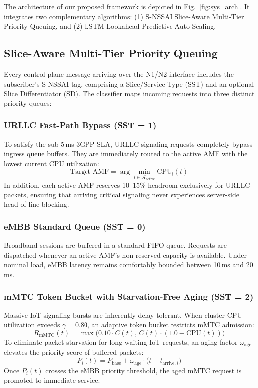 \documentclass[conference]{IEEEtran}
\begin{document}
The architecture of our proposed framework is depicted in Fig.~\ref{fig:sys_arch}. It integrates two complementary algorithms: (1) S-NSSAI Slice-Aware Multi-Tier Priority Queuing, and (2) LSTM Lookahead Predictive Auto-Scaling.

\subsection{Slice-Aware Multi-Tier Priority Queuing}
Every control-plane message arriving over the N1/N2 interface includes the subscriber's S-NSSAI tag, comprising a Slice/Service Type (SST) and an optional Slice Differentiator (SD). The classifier maps incoming requests into three distinct priority queues:

\subsubsection{URLLC Fast-Path Bypass (SST = 1)}
To satisfy the sub-5\,ms 3GPP SLA, URLLC signaling requests completely bypass ingress queue buffers. They are immediately routed to the active AMF with the lowest current CPU utilization:
\begin{equation}
\text{Target AMF} = \arg\min_{i \in \mathcal{A}_{\text{active}}} \text{CPU}_i(t)
\end{equation}
In addition, each active AMF reserves 10--15\% headroom exclusively for URLLC packets, ensuring that arriving critical signaling never experiences server-side head-of-line blocking.

\subsubsection{eMBB Standard Queue (SST = 0)}
Broadband sessions are buffered in a standard FIFO queue. Requests are dispatched whenever an active AMF's non-reserved capacity is available. Under nominal load, eMBB latency remains comfortably bounded between 10\,ms and 20\,ms.

\subsubsection{mMTC Token Bucket with Starvation-Free Aging (SST = 2)}
Massive IoT signaling bursts are inherently delay-tolerant. When cluster CPU utilization exceeds $\gamma = 0.80$, an adaptive token bucket restricts mMTC admission:
\begin{equation}
R_{\text{mMTC}}(t) = \max\Big(0.10 \cdot C(t), \, C(t) \cdot (1.0 - \text{CPU}(t))\Big)
\end{equation}
To eliminate packet starvation for long-waiting IoT requests, an aging factor $\omega_{\text{age}}$ elevates the priority score of buffered packets:
\begin{equation}
P_i(t) = P_{\text{base}} + \omega_{\text{age}} \cdot \big(t - t_{\text{arrive}, i}\big)
\label{eq:aging}
\end{equation}
Once $P_i(t)$ crosses the eMBB priority threshold, the aged mMTC request is promoted to immediate service.
\end{document}
